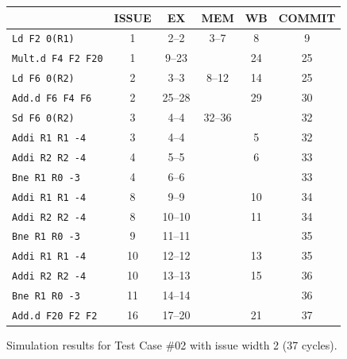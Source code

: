 \documentclass[11pt]{article}
\renewcommand{\_}{\origunderscore\allowbreak}
\begin{document}
\begin{figure}[H]
\centering
\small
\begin{tabular}{lccccc}
\hline
 & ISSUE & EX & MEM & WB & COMMIT \\
\hline
\texttt{Ld F2 0(R1)} & 1 & 2--2 & 3--7 & 8 & 9 \\
\texttt{Mult.d F4 F2 F20} & 1 & 9--23 &  & 24 & 25 \\
\texttt{Ld F6 0(R2)} & 2 & 3--3 & 8--12 & 14 & 25 \\
\texttt{Add.d F6 F4 F6} & 2 & 25--28 &  & 29 & 30 \\
\texttt{Sd F6 0(R2)} & 3 & 4--4 & 32--36 &  & 32 \\
\texttt{Addi R1 R1 -4} & 3 & 4--4 &  & 5 & 32 \\
\texttt{Addi R2 R2 -4} & 4 & 5--5 &  & 6 & 33 \\
\texttt{Bne R1 R0 -3} & 4 & 6--6 &  &  & 33 \\
\texttt{Addi R1 R1 -4} & 8 & 9--9 &  & 10 & 34 \\
\texttt{Addi R2 R2 -4} & 8 & 10--10 &  & 11 & 34 \\
\texttt{Bne R1 R0 -3} & 9 & 11--11 &  &  & 35 \\
\texttt{Addi R1 R1 -4} & 10 & 12--12 &  & 13 & 35 \\
\texttt{Addi R2 R2 -4} & 10 & 13--13 &  & 15 & 36 \\
\texttt{Bne R1 R0 -3} & 11 & 14--14 &  &  & 36 \\
\texttt{Add.d F20 F2 F2} & 16 & 17--20 &  & 21 & 37 \\
\hline
\end{tabular}
\caption{Simulation results for Test Case \#02 with issue width 2 (37 cycles).}
\end{figure}
\end{document}
